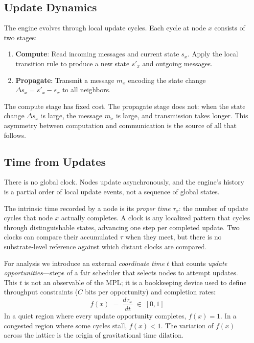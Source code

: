 \documentclass[aps, pra, reprint, superscriptaddress, nofootinbib, singlespacing]{revtex4-2}
\begin{document}
\subsection{Update Dynamics}
\label{subsec:dynamics}

The engine evolves through local update cycles. Each cycle at node $x$ consists of two stages:
\begin{enumerate}
    \item \textbf{Compute}: Read incoming messages and current state $s_x$. Apply the local transition rule to produce a new state $s'_x$ and outgoing messages.
    \item \textbf{Propagate}: Transmit a message $m_x$ encoding the state change $\Delta s_x = s'_x - s_x$ to all neighbors.
\end{enumerate}

The compute stage has fixed cost. The propagate stage does not: when the state change $\Delta s_x$ is large, the message $m_x$ is large, and transmission takes longer. This asymmetry between computation and communication is the source of all that follows.

\subsection{Time from Updates}
\label{subsec:time}

There is no global clock. Nodes update asynchronously, and the engine's history is a partial order of local update events, not a sequence of global states.

The intrinsic time recorded by a node is its \emph{proper time} $\tau_x$: the number of update cycles that node $x$ actually completes. A clock is any localized pattern that cycles through distinguishable states, advancing one step per completed update. Two clocks can compare their accumulated $\tau$ when they meet, but there is no substrate-level reference against which distant clocks are compared.

For analysis we introduce an external \emph{coordinate time} $t$ that counts \emph{update opportunities}—steps of a fair scheduler that selects nodes to attempt updates. This $t$ is not an observable of the MPL; it is a bookkeeping device used to define throughput constraints ($C$ bits per opportunity) and completion rates:
\begin{equation}
f(x) \;=\; \frac{d\tau_x}{dt} \;\in\; [0,1]
\label{eq:completion-rate}
\end{equation}
In a quiet region where every update opportunity completes, $f(x) = 1$. In a congested region where some cycles stall, $f(x) < 1$. The variation of $f(x)$ across the lattice is the origin of gravitational time dilation.
\end{document}
